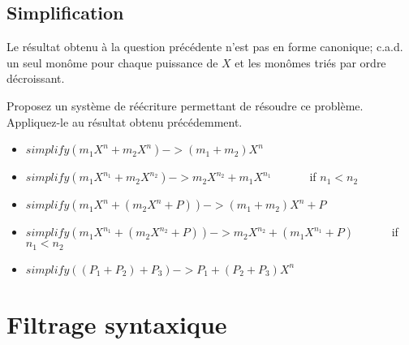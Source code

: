 \documentclass[11pt]{article}
\begin{document}
\subsection{Simplification}

Le résultat obtenu à la question précédente n'est pas en forme
canonique; c.a.d. un seul monôme pour chaque puissance de $X$ et les
monômes triés par ordre décroissant.

Proposez un système de réécriture permettant de résoudre ce
problème. Appliquez-le au résultat obtenu précédemment.

\begin{versionProf}
\begin{itemize}
\item[] $simplify(m_1 X^n + m_2 X^n) -> (m_1+m_2) X^n$
\item[] $simplify(m_1 X^{n_1} + m_2 X^{n_2}) -> m_2 X^{n_2} + m_1 X^{n_1}$
  ~~~~~~if $n_1 < n_2$

\item[] $simplify(m_1 X^n + (m_2 X^n + P)) -> (m_1+m_2) X^n + P$
\item[] $simplify(m_1 X^{n_1} + (m_2 X^{n_2} + P)) -> 
  m_2 X^{n_2} + (m_1 X^{n_1} + P)$
  ~~~~~~if $n_1 < n_2$

\item[] $simplify((P_1 + P_2) + P_3) -> P_1 + (P_2 + P_3) X^n$
\end{itemize}
\end{versionProf}




\section{Filtrage syntaxique}
\end{document}
